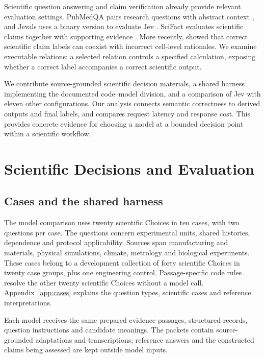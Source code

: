 \documentclass[11pt]{article}
\begin{document}
Scientific question answering and claim verification already provide relevant evaluation settings. PubMedQA pairs research questions with abstract context \citep{jin2019pubmedqa}, and Jevals uses a binary version to evaluate Jev \citep{jevals2026methodology}. SciFact evaluates scientific claims together with supporting evidence \citep{wadden2020fact}. More recently, \citet{ho2025table} showed that correct scientific claim labels can coexist with incorrect cell-level rationales. We examine executable relations: a selected relation controls a specified calculation, exposing whether a correct label accompanies a correct scientific output.

We contribute source-grounded scientific decision materials, a shared harness implementing the documented code--model division, and a comparison of Jev with eleven other configurations. Our analysis connects semantic correctness to derived outputs and final labels, and compares request latency and response cost. This provides concrete evidence for choosing a model at a bounded decision point within a scientific workflow.

\section{Scientific Decisions and Evaluation}
\label{sec:evaluation}

\subsection{Cases and the shared harness}
\label{sec:cases}

The model comparison uses twenty scientific Choices in ten cases, with two questions per case. The questions concern experimental units, shared histories, dependence and protocol applicability. Sources span manufacturing and materials, physical simulations, climate, metrology and biological experiments. These cases belong to a development collection of forty scientific Choices in twenty case groups, plus one engineering control. Passage-specific code rules resolve the other twenty scientific Choices without a model call. Appendix~\ref{app:cases} explains the question types, scientific cases and reference interpretations.

Each model receives the same prepared evidence passages, structured records, question instructions and candidate meanings. The packets contain source-grounded adaptations and transcriptions; reference answers and the constructed claims being assessed are kept outside model inputs.
\end{document}
